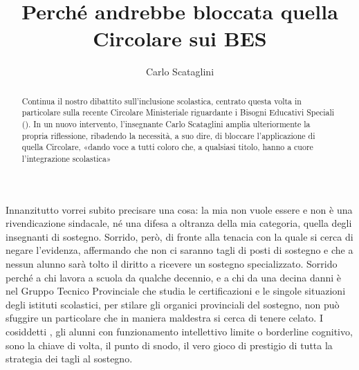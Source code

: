 \author{Carlo Scataglini}
\title{Perché andrebbe bloccata quella Circolare sui BES}
\label{cha:scataglini170613}
\begin{abstract}
Continua il nostro dibattito sull'inclusione scolastica, centrato questa volta in particolare sulla recente Circolare Ministeriale riguardante i Bisogni Educativi Speciali (). In un nuovo intervento, l'insegnante Carlo Scataglini amplia ulteriormente la propria riflessione, ribadendo la necessità, a suo dire, di bloccare l'applicazione di quella Circolare, «dando voce a tutti coloro che, a qualsiasi titolo, hanno a cuore l'integrazione scolastica»
\end{abstract}
\maketitle
Innanzitutto vorrei subito precisare una cosa: la mia non vuole essere e non è una rivendicazione sindacale, né una difesa a oltranza della mia categoria, quella degli insegnanti di sostegno. Sorrido, però, di fronte alla tenacia con la quale si cerca di negare l'evidenza, affermando che non ci saranno tagli di posti di sostegno e che a nessun alunno sarà tolto il diritto a ricevere un sostegno specializzato. Sorrido perché a chi lavora a scuola da qualche decennio, e a chi da una decina danni è nel Gruppo Tecnico Provinciale che studia le certificazioni e le singole situazioni degli istituti scolastici, per stilare gli organici provinciali del sostegno, non può sfuggire un particolare che in maniera maldestra si cerca di tenere celato. I cosiddetti , gli alunni con funzionamento intellettivo limite o borderline cognitivo, sono la chiave di volta, il punto di snodo, il vero gioco di prestigio di tutta la strategia dei tagli al sostegno.

